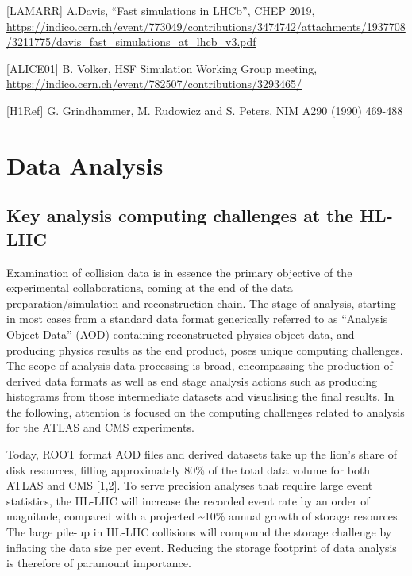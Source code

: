 \documentclass[11pt,a4paper]{article}
\begin{document}
{[}LAMARR{]} A.Davis, ``Fast simulations in LHCb'', CHEP 2019,
\href{https://indico.cern.ch/event/773049/contributions/3474742/attachments/1937708/3211775/davis_fast_simulations_at_lhcb_v3.pdf}{{https://indico.cern.ch/event/773049/contributions/3474742/attachments/1937708/3211775/davis\_fast\_simulations\_at\_lhcb\_v3.pdf}}

{[}ALICE01{]} B. Volker, HSF Simulation Working Group meeting,
\href{https://indico.cern.ch/event/782507/contributions/3293465/}{{https://indico.cern.ch/event/782507/contributions/3293465/}}

{[}H1Ref{]} G. Grindhammer, M. Rudowicz and S. Peters, NIM A290 (1990)
469-488



\hypertarget{data-analysis}{%
\section{Data Analysis}\label{data-analysis}}

\hypertarget{key-analysis-computing-challenges-at-the-hl-lhc}{%
\subsection{Key analysis computing challenges at the
HL-LHC}\label{key-analysis-computing-challenges-at-the-hl-lhc}}

Examination of collision data is in essence the primary objective of the
experimental collaborations, coming at the end of the data
preparation/simulation and reconstruction chain. The stage of analysis,
starting in most cases from a standard data format generically referred
to as ``Analysis Object Data'' (AOD) containing reconstructed physics
object data, and producing physics results as the end product, poses
unique computing challenges. The scope of analysis data processing is
broad, encompassing the production of derived data formats as well as
end stage analysis actions such as producing histograms from those
intermediate datasets and visualising the final results. In the
following, attention is focused on the computing challenges related to
analysis for the ATLAS and CMS experiments.

Today, ROOT format AOD files and derived datasets take up the lion's
share of disk resources, filling approximately 80\% of the total data
volume for both ATLAS and CMS {[}1,2{]}. To serve precision analyses
that require large event statistics, the HL-LHC will increase the
recorded event rate by an order of magnitude, compared with a projected
\textasciitilde 10\% annual growth of storage resources. The large pile-up in HL-LHC
collisions will compound the storage challenge by inflating the data
size per event. Reducing the storage footprint of data analysis is
therefore of paramount importance.
\end{document}
